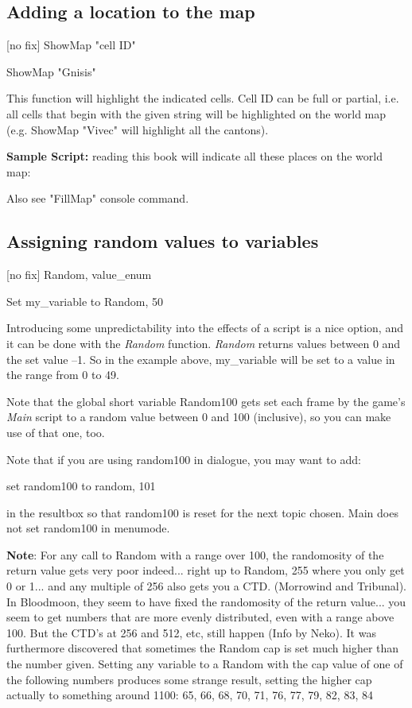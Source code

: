 \hypertarget{adding-a-location-to-the-map}{%
\subsection{Adding a location to the
map}\label{adding-a-location-to-the-map}}

{[}no fix{]} ShowMap "cell ID"

ShowMap "Gnisis"

This function will highlight the indicated cells. Cell ID can be full or
partial, i.e. all cells that begin with the given string will be
highlighted on the world map (e.g. ShowMap "Vivec" will highlight all
the cantons).

\textbf{Sample Script:} reading this book will indicate all these places
on the world map:



Also see "FillMap" console command.

\hypertarget{assigning-random-values-to-variables}{%
\subsection{Assigning random values to variables}\label{assigning-random-values-to-variables}}

{[}no fix{]} Random, value\_enum

Set my\_variable to Random, 50

Introducing some unpredictability into the effects of a script is a nice
option, and it can be done with the \emph{Random} function.
\emph{Random} returns values between 0 and the set value --1. So in the
example above, my\_variable will be set to a value in the range from 0
to 49.

Note that the global short variable Random100 gets set each frame by the
game's \emph{Main} script to a random value between 0 and 100
(inclusive), so you can make use of that one, too.

Note that if you are using random100 in dialogue, you may want to add:

set random100 to random, 101

in the resultbox so that random100 is reset for the next topic chosen.
Main does not set random100 in menumode.

\textbf{Note}: For any call to Random with a range over 100, the
randomosity of the return value gets very poor indeed... right up to
Random, 255 where you only get 0 or 1... and any multiple of 256 also
gets you a CTD. (Morrowind and Tribunal). In Bloodmoon, they seem to
have fixed the randomosity of the return value... you seem to get
numbers that are more evenly distributed, even with a range above 100.
But the CTD's at 256 and 512, etc, still happen (Info by Neko). It was
furthermore discovered that sometimes the Random cap is set much higher
than the number given. Setting any variable to a Random with the cap
value of one of the following numbers produces some strange result,
setting the higher cap actually to something around 1100: 65, 66, 68,
70, 71, 76, 77, 79, 82, 83, 84

